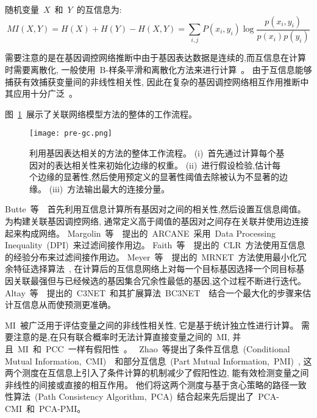 随机变量~$X$~和~$Y$~的互信息为:
\begin{equation}
MI(X,Y) = H(X) + H(Y) - H(X,Y) = \sum\limits_{i,j} {P(x_i ,y_i )\log \frac{{p(x_i,y_i )}}{{p(x_i )p(y_i )}}} 
\end{equation}

需要注意的是在基因调控网络推断中由于基因表达数据是连续的,而互信息在计算时需要离散化,
一般使用~B-样条平滑和离散化方法来进行计算~\cite{daub2004estimating}。
由于互信息能够捕获有效捕获变量间的非线性相关性,
因此在复杂的基因调控网络相互作用推断中其应用十分广泛~\cite{brunel2010miss,zhang2011inferring}。

图~\ref{fig:pre-gc}~展示了关联网络模型方法的整体的工作流程。
\begin{figure}[!htbp]
    \centering
    \texttt{[image: pre-gc.png]}
    \caption{
        利用基因表达相关的方法的整体工作流程。
        (i)~首先通过计算每个基因对的表达相关性来初始化边缘的权重。
        (ii)~进行假设检验,估计每个边缘的显著性,然后使用预定义的显著性阈值去除被认为不显著的边缘。
        (iii)~方法输出最大的连接分量。
    }
    \label{fig:pre-gc}
\end{figure}


Butte~等~\cite{basso2005reverse}~首先利用互信息计算所有基因对之间的相关性,然后设置互信息阈值。
为构建关联基因调控网络, 通常定义高于阈值的基因对之间存在关联并使用边连接起来构成网络。
Margolin~等~\cite{margolin2006aracne}~提出的~ARCANE~采用~Data Processing Inequality~(DPI)~来过滤间接作用边。
Faith~等~\cite{faith2007large}~提出的~CLR~方法使用互信息的经验分布来过滤间接作用边。
Meyer~等~\cite{meyer2007information}~提出的~MRNET~方法使用最小化冗余特征选择算法~\cite{peng2005feature},
在计算后的互信息网络上对每一个目标基因选择一个同目标基因关联最强但与已经候选的基因集合冗余性最低的基因,这个过程不断进行迭代。
Altay~等~\cite{altay2010inferring}~提出的~C3NET~和其扩展算法~BC3NET~\cite{de2012bagging}~结合一个最大化的步骤来估计互信息从而使预测更准确。

MI~被广泛用于评估变量之间的非线性相关性,
它是基于统计独立性进行计算。
需要注意的是,在只有联合概率时无法计算直接变量之间的~MI,
并且~MI~和~PCC~一样有假阳性~\cite{frenzel2007partial,schreiber2000measuring}。
~Zhao~等提出了条件互信息~(Conditional Mutual Information,~CMI)~\cite{zhang2011inferring}~和部分互信息~(Part Mutual Information,~PMI)~\cite{zhao2016part},
这两个测度在互信息上引入了条件计算的机制减少了假阳性边,
能有效检测变量之间非线性的间接或直接的相互作用。
他们将这两个测度与基于贪心策略的路径一致性算法~(Path Consistency Algorithm,~PCA)~结合起来先后提出了~PCA-CMI\cite{zhang2011inferring}~和~PCA-PMI\cite{zhao2016part}。

